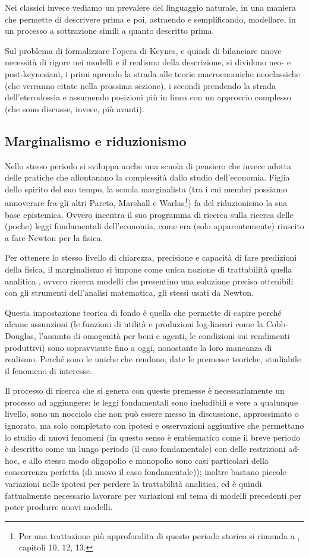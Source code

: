 \documentclass[a4paper, headings=standardclasses]{scrartcl}
\begin{document}
Nei classici invece vediamo un prevalere del linguaggio naturale, in una maniera che permette di descrivere prima e poi, astraendo e semplificando, modellare, in un processo a sottrazione simili a quanto descritto prima.

Sul problema di formalizzare l'opera di Keynes, e quindi di bilanciare nuove necessità di rigore nei modelli e il realismo della descrizione, si dividono neo- e post-keynesiani, i primi aprendo la strada alle teorie macroenomiche neoclassiche (che verranno citate nella prossima sezione), i secondi prendendo la strada dell'eterodossia e assumendo posizioni più in linea con un approccio complesso (che sono discusse, invece, più avanti).

\subsection{Marginalismo e riduzionismo}
Nello stesso periodo si sviluppa anche una scuola di pensiero che invece adotta delle pratiche che allontanano la complessità dallo studio dell'economia.
Figlia dello spirito del suo tempo, la scuola marginalista (tra i cui membri possiamo annoverare fra gli altri Pareto, Marshall e Warlas\footnote{Per una trattazione più approfondita di questo periodo storico si rimanda a \textcite{roncaglia2016}, capitoli 10, 12, 13.}) fa del riduzionismo la sua base epistemica. Ovvero incentra il suo programma di ricerca sulla ricerca delle (poche) leggi fondamentali dell'economia, come era (solo apparentemente) riuscito a fare Newton per la fisica.

Per ottenere lo stesso livello di chiarezza, precisione e capacità di fare predizioni della fisica, il marginalismo si impone come unica nozione di trattabilità quella analitica \parencite{cherrier2022}, ovvero ricerca modelli che presentino una soluzione precisa ottenibili con gli strumenti dell'analisi matematica, gli stessi usati da Newton.

Questa impostazione teorica di fondo è quella che permette di capire perché alcune assunzioni (le funzioni di utilità e produzioni log-lineari come la Cobb-Douglas, l'assunto di omogenità per beni e agenti, le condizioni sui rendimenti produttivi) sono sopravvisute fino a oggi, nonostante la loro mancanza di realismo. Perché sono le uniche che rendono, date le premesse teoriche, studiabile il fenomeno di interesse.

Il processo di ricerca che si genera con queste premesse è necessariamente un processo ad aggiungere: le leggi fondamentali sono ineludibili e vere a qualunque livello, sono un nocciolo che non può essere messo in discussione, approssimato o ignorato, ma solo completato con ipotesi e osservazioni aggiuntive che permettano lo studio di nuovi fenomeni (in questo senso è emblematico come il breve periodo è descritto come un lungo periodo (il caso fondamentale) con delle restrizioni ad-hoc, e allo stesso modo oligopolio e monopolio sono casi particolari della concorrenza perfetta (di nuovo il caso fondamentale)); inoltre bastano piccole variazioni nelle ipotesi per perdere la trattabilità analitica, ed è quindi fattualmente necessario lavorare per variazioni sul tema di modelli precedenti per poter produrre nuovi modelli.
\end{document}
